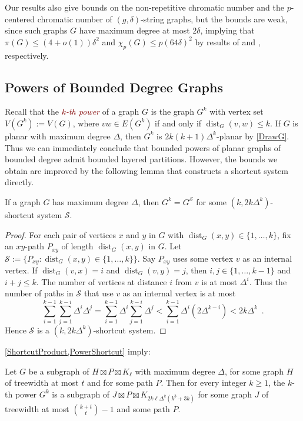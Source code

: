 \documentclass{patmorin}
\newcommand{\defin}[1]{\textcolor{Maroon}{\emph{#1}}}
\DeclareMathOperator{\dist}{dist}
\renewcommand{\SS}{\mathcal{S}}
\renewcommand{\le}{\leqslant}
\renewcommand{\geq}{\geqslant}
\renewcommand{\leq}{\leqslant}
\begin{document}
Our results also give bounds on the non-repetitive chromatic number and the $p$-centered chromatic number of $(g,\delta)$-string graphs, but the bounds are weak, since such graphs $G$ have maximum degree at most $2\delta$, implying that $\pi(G) \leq (4+o(1))\delta^2$ and $\chi_p(G)\le p(64\delta)^2$ by results of \citet{DJKW16} and \citet{DFMS21}, respectively.

\subsection{Powers of Bounded Degree Graphs}
\label{Powers}

Recall that the \defin{$k$-th power} of a graph $G$ is the graph $G^k$ with vertex set $V(G^k):=V(G)$, where $vw\in E(G^k)$ if and only if $\dist_G(v,w)\leq k$. If $G$ is planar with maximum degree $\Delta$, then $G^k$ is $2k(k+1)\Delta^{k}$-planar by \cref{DrawG}. Thus we can immediately conclude that bounded powers of planar graphs of bounded degree admit bounded layered partitions. However, the bounds we obtain are improved by the following lemma that constructs a shortcut system directly.

\begin{lem}
\label{PowerShortcut}
If a graph $G$ has maximum degree $\Delta$, then $G^k = G^\SS$ for some $(k,2k \Delta^{k})$-shortcut system $\SS$.
\end{lem}

\begin{proof}
For each pair of vertices $x$ and $y$ in $G$ with $\dist_G(x,y)\in\{1,\dots,k\}$, fix an $xy$-path $P_{xy}$ of length
$\dist_G(x,y)$  in $G$. Let $\SS:=\{P_{xy}: \dist_G(x,y)\in\{1,\dots,k\} \}$. Say $P_{xy}$ uses some vertex $v$ as an internal vertex. If $\dist_G(v,x)=i$ and $\dist_G(v,y)=j$, then $i,j\in\{1,\dots,k-1\}$ and $i+j\leq k$. The number of vertices at distance $i$ from $v$ is at most $\Delta^i$. Thus the number of paths in $\SS$ that use $v$ as an internal vertex is at most
\[\sum_{i=1}^{k-1} \sum_{j=1}^{k-i} \Delta^i\Delta^j
= \sum_{i=1}^{k-1} \Delta^i \sum_{j=1}^{k-i} \Delta^j
< \sum_{i=1}^{k-1} \Delta^i ( 2 \Delta^{k-i} )
< 2k \Delta^k\enspace.\]
Hence $\SS$ is a $(k, 2k \Delta^k)$-shortcut system.
\end{proof}

\cref{ShortcutProduct,PowerShortcut} imply:

\begin{thm}
\label{PowerProduct}
Let $G$ be a subgraph of $H\boxtimes P\boxtimes K_\ell$ with maximum degree $\Delta$, for some graph $H$ of treewidth at most $t$ and for some path $P$. Then for every integer $k\geq 1$, the $k$-th power $G^k$ is a subgraph of $J\boxtimes P\boxtimes K_{2k \ell \Delta^{k}(k^3+3k)}$ for some graph $J$ of treewidth at most $\binom{k+t}{t}-1$ and some path $P$.
\end{thm}
\end{document}
